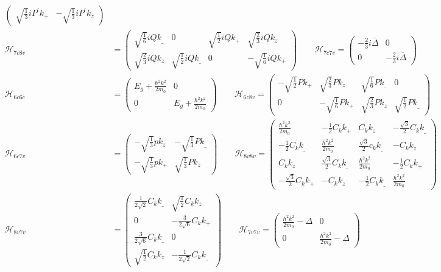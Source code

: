 \begin{align*}
\begin{pmatrix}
 \sqrt{\frac{1}{3}}iP^{'}k_+ & -\sqrt{\frac{1}{3}}iP^{'}k_z
\end{pmatrix}\\
\mathcal{H}_{7c8v}&=\begin{pmatrix}
\sqrt{\frac{1}{6}} iQk_\_ &0 &\sqrt{\frac{1}{2}}iQk_+ &\sqrt{\frac{2}{3}} iQk_z\\
\sqrt{\frac{2}{3}} iQk_z &\sqrt{\frac{1}{2}} iQk_\_ &0 &-\sqrt{\frac{1}{6}} iQk_+
\end{pmatrix}\qquad
\mathcal{H}_{7c7v}=\begin{pmatrix}
-\frac{2}{3}i\overline{\Delta} &0\\
0 &-\frac{2}{3}i\overline{\Delta}
\end{pmatrix}\\
\mathcal{H}_{6c6c}&=\begin{pmatrix}
E_g +\frac{\hbar^2k^2}{2m_0} & 0\\
0 &E_g +\frac{\hbar^2k^2}{2m_0}
\end{pmatrix}\qquad
\mathcal{H}_{6c8v}=\begin{pmatrix}
-\sqrt{\frac{1}{2}}Pk_+ &\sqrt{\frac{2}{3}}Pk_z &\sqrt{\frac{1}{6}}Pk_\_ &0 \\
0 &-\sqrt{\frac{1}{6}}Pk_+ &\sqrt{\frac{2}{3}}Pk_z &\sqrt{\frac{1}{2}}Pk_\_
\end{pmatrix}\\
\mathcal{H}_{6c7v}&=\begin{pmatrix}
-\sqrt{\frac{1}{3}}pk_z &-\sqrt{\frac{1}{3}}Pk_\_\\
-\sqrt{\frac{1}{3}}pk_+ &\sqrt{\frac{1}{3}}Pk_z
\end{pmatrix}\qquad
\mathcal{H}_{8v8v}=\begin{pmatrix}
\frac{\hbar^2k^2}{2m_0} & -\frac{1}{2}C_{k}k_+ & C_k k_z &-\frac{\sqrt{3}}{2}C_k k_\_ \\
-\frac{1}{2}C_{k}k_\_ &\frac{\hbar^2k^2}{2m_0} &\frac{\sqrt{3}}{2}c_k k_\_ &-C_k k_z \\
C_kk_z &\frac{\sqrt{3}}{2}C_kk_\_  &\frac{\hbar^2k^2}{2m_0} &-\frac{1}{2}C_{k}k_+\\
-\frac{\sqrt{3}}{2}C_kk_+ &-C_kk_z &-\frac{1}{2}C_{k}k_\_ &\frac{\hbar^2k^2}{2m_0}
\end{pmatrix}\\
\mathcal{H}_{8v7v}&=\begin{pmatrix}
\frac{1}{2\sqrt{2}}C_{k}k_\_ &\sqrt{\frac{1}{2}}C_{k}k_z \\
0 & -\frac{3}{2\sqrt{6}}C_{k}k_+ \\
\frac{3}{2\sqrt{6}}C_{k}k_\_ &0 \\
\sqrt{\frac{1}{2}}C_{k }k_z &-\frac{1}{2\sqrt{2}}C_k k_\_
\end{pmatrix}\qquad
\mathcal{H}_{7v7v}=\begin{pmatrix}
\frac{\hbar^2k^2}{2m_0}-\Delta &0\\
0 &\frac{\hbar^2k^2}{2m_0}-\Delta
\end{pmatrix}
\end{align*}
